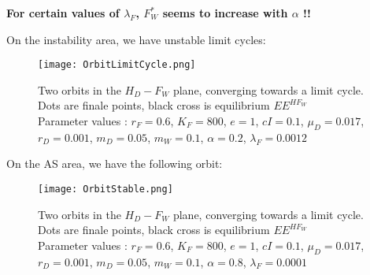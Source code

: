 \documentclass{article}
\newcommand{\lfw}{\lambda_{F}}
\newcommand{\lfw}{\lambda_{F}}
\begin{document}
\textbf{For certain values of $\lfw$, $F^*_W$ seems to increase with $\alpha$ !!}

On the instability area, we have unstable limit cycles:

\begin{figure}[!ht]
\centering
\texttt{[image: OrbitLimitCycle.png]}
\caption{\centering Two orbits in the $H_D - F_W$ plane, converging towards a limit cycle. Dots are finale points, black cross is equilibrium $EE^{HF_W}$ \\
Parameter values : $r_F = 0.6$, $K_F = 800$, $e=1$, $cI = 0.1$, $\mu_D = 0.017$, $r_D = 0.001$, $m_D = 0.05$, $m_W = 0.1$, $\alpha = 0.2$, $\lfw = 0.0012$}
\end{figure}

\newpage
On the AS area, we have the following orbit:

\begin{figure}[!ht]
\centering
\texttt{[image: OrbitStable.png]}
\caption{\centering Two orbits in the $H_D - F_W$ plane, converging towards a limit cycle. Dots are finale points, black cross is equilibrium $EE^{HF_W}$ \\
Parameter values : $r_F = 0.6$, $K_F = 800$, $e=1$, $cI = 0.1$, $\mu_D = 0.017$, $r_D = 0.001$, $m_D = 0.05$, $m_W = 0.1$, $\alpha = 0.8$, $\lfw = 0.0001$}
\end{figure}
\end{document}
